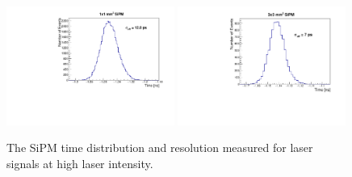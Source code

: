 \begin{figure}[htbp] 
\centering
\includegraphics[width=0.49\textwidth]{figures/DeltaT_LargeNPhotons_1x1SiPM.pdf} 
\includegraphics[width=0.49\textwidth]{figures/DeltaT_LargeNPhotons_3x3SiPM.pdf} 
\caption{The SiPM time distribution and resolution measured for laser signals at high laser intensity.} 
\label{fig:LargeLightTimeResolution} 
\end{figure} 

